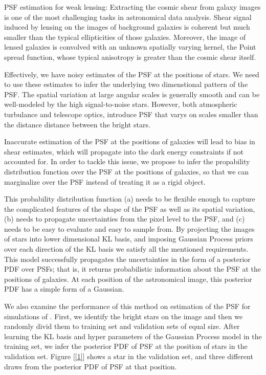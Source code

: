 \documentclass[12pt]{article}
\begin{document}
PSF estimation for weak lensing:
Extracting the cosmic shear from galaxy images is one of the most challenging tasks in astronomical
data analysis. Shear signal induced by lensing on the images of background galaxies
is coherent but much smaller than the typical 
ellipticities of those galaxies. Moreover, the image of lensed galaxies is convolved with 
an unknown spatially varying kernel, the Point spread function, whose typical
anisotropy is greater than the cosmic shear itself.
 
Effectively, we have 
noisy estimates of the PSF at the positions of stars. We need to use these estimates to infer the
underlying two dimenstional pattern of the PSF. The spatial variation at large angular scales is 
generally smooth and can be well-modeled by the high signal-to-noise stars. However, both atmospheric
turbulance and telescope optics, introduce PSF that varys on scales smaller than the distance
distance between the bright stars. 

Inaccurate estimation of the PSF at the positions of galaxies will lead to bias in shear estimates,
which will propagate into the dark energy constraints if not accounted for. In order to
tackle this issue, we propose to infer the propability distribution function over the PSF
at the positions of galaxies, so that we can marginalize over the PSF instead of treating it 
as a rigid object.

This probability distribution function (a) needs to be flexible enough to capture the complicated 
features of the shape of the PSF as well as its spatial variation, (b) needs to propagate uncertainties
from the pixel level to the PSF, and (c) needs to be easy to evaluate and easy to sample from. By 
projecting the images of stars into lower dimensional KL basis, and imposing Gaussian Process priors 
over each direction of the KL basis we satisfy all the mentioned requirements. This model successfully propagates
the uncertainties in the form of a posterior PDF over PSFs; 
that is, it returns probabilistic information about the PSF at the positions of galaxies. At each
position of the astronomical image, this posterior PDF has a simple form of a Gaussian.

We also examine the performance of this method on estimation of the PSF for simulations 
of \lsst. First, we identify the bright stars on the image and then we randomly divid
them to training set and validation sets of equal size. After learning the KL basis and 
hyper parameters of the Gaussian Process model in the training set, we infer the posterior 
PDF of PSF at the position of stars in the validation set. Figure [\ref{1}] shows a star
in the validation set, and three different draws from the posterior PDF of PSF at that position.
\end{document}
